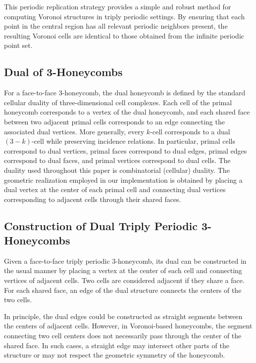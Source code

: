 \documentclass[times,twocolumn,final]{elsarticle}
\begin{document}
This periodic replication strategy provides a simple and robust method for computing Voronoi structures in triply periodic settings. By ensuring that each point in the central region has all relevant periodic neighbors present, the resulting Voronoi cells are identical to those obtained from the infinite periodic point set.

\subsection{Dual of 3-Honeycombs}

{\color{red}For a face-to-face 3-honeycomb, the dual honeycomb is defined by the standard cellular duality of three-dimensional cell complexes. Each cell of the primal honeycomb corresponds to a vertex of the dual honeycomb, and each shared face between two adjacent primal cells corresponds to an edge connecting the associated dual vertices. More generally, every $k$-cell corresponds to a dual $(3-k)$-cell while preserving incidence relations. In particular, primal cells correspond to dual vertices, primal faces correspond to dual edges, primal edges correspond to dual faces, and primal vertices correspond to dual cells. The duality used throughout this paper is combinatorial (cellular) duality. The geometric realization employed in our implementation is obtained by placing a dual vertex at the center of each primal cell and connecting dual vertices corresponding to adjacent cells through their shared faces.}

\subsection{Construction of Dual Triply Periodic 3-Honeycombs}

Given a face-to-face triply periodic $3$-honeycomb, its dual can be constructed in the usual manner by placing a vertex at the center of each cell and connecting vertices of adjacent cells. Two cells are considered adjacent if they share a face. For each shared face, an edge of the dual structure connects the centers of the two cells.

In principle, the dual edges could be constructed as straight segments between the centers of adjacent cells. However, in Voronoi-based honeycombs, the segment connecting two cell centers does not necessarily pass through the center of the shared face. In such cases, a straight edge may intersect other parts of the structure or may not respect the geometric symmetry of the honeycomb.
\end{document}
